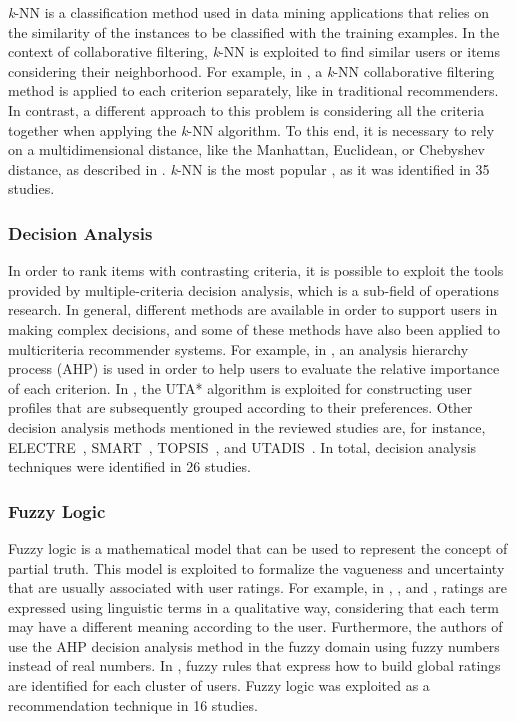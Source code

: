 \textit{k}-NN is a classification method used in data mining applications that relies on the similarity of the instances to be classified with the training examples. In the context of collaborative filtering, \textit{k}-NN is exploited to find similar users or items considering their neighborhood. For example, in , a \textit{k}-NN collaborative filtering method is applied to each criterion separately, like in traditional recommenders. In contrast, a different approach to this problem is considering all the criteria together when applying the \textit{k}-NN algorithm. To this end, it is necessary to rely on a multidimensional distance, like the Manhattan, Euclidean, or Chebyshev distance, as described in . \textit{k}-NN is the most popular , as it was identified in 35 studies.

\subsubsection{Decision Analysis}

In order to rank items with contrasting criteria, it is possible to exploit the tools provided by multiple-criteria decision analysis, which is a sub-field of operations research. In general, different methods are available in order to support users in making complex decisions, and some of these methods have also been applied to multicriteria recommender systems. For example, in , an analysis hierarchy process (AHP) is used in order to help users to evaluate the relative importance of each criterion. In , the UTA* algorithm is exploited for constructing user profiles that are subsequently grouped according to their preferences. Other decision analysis methods mentioned in the reviewed studies are, for instance, ELECTRE~, SMART~, TOPSIS~, and UTADIS~. In total, decision analysis techniques were identified in 26 studies.

\subsubsection{Fuzzy Logic}

Fuzzy logic is a mathematical model that can be used to represent the concept of partial truth. This model is exploited to formalize the vagueness and uncertainty that are usually associated with user ratings. For example, in , , and , ratings are expressed using linguistic terms in a qualitative way, considering that each term may have a different meaning according to the user. Furthermore, the authors of  use the AHP decision analysis method in the fuzzy domain using fuzzy numbers instead of real numbers. In , fuzzy rules that express how to build global ratings are identified for each cluster of users. Fuzzy logic was exploited as a recommendation technique in 16 studies.

